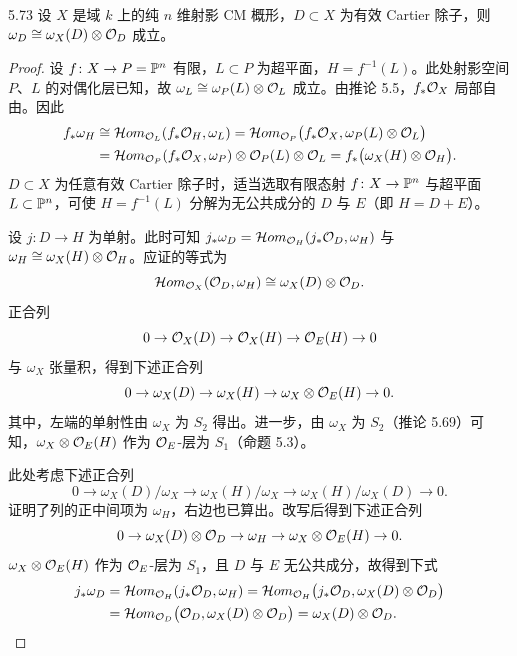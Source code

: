 \begin{propositionp}{5.73}
设 $X$ 是域 $k$ 上的纯 $n$ 维射影 CM 概形，$D\subset X$ 为有效 Cartier 除子，则 $\omega_D\cong\omega_X(D)\otimes\mathcal{O}_D$ 成立。
\end{propositionp}

\begin{proof}
设 $f\colon X\to P=\mathbb{P}^n$ 有限，$L\subset P$ 为超平面，$H=f^{-1}(L)$。此处射影空间 $P$、$L$ 的对偶化层已知，故 $\omega_L\cong\omega_P(L)\otimes\mathcal{O}_L$ 成立。由推论 5.5，$f_*\mathcal{O}_X$ 局部自由。因此
\[
\begin{aligned}
f_*\omega_H&\cong\mathcal{H}om_{\mathcal{O}_L}(f_*\mathcal{O}_H,\omega_L)=\mathcal{H}om_{\mathcal{O}_P}\bigl(f_*\mathcal{O}_X,\omega_P(L)\otimes\mathcal{O}_L\bigr)\\
&=\mathcal{H}om_{\mathcal{O}_P}(f_*\mathcal{O}_X,\omega_P)\otimes\mathcal{O}_P(L)\otimes\mathcal{O}_L=f_*\bigl(\omega_X(H)\otimes\mathcal{O}_H\bigr).
\end{aligned}
\]
$D\subset X$ 为任意有效 Cartier 除子时，适当选取有限态射 $f\colon X\to\mathbb{P}^n$ 与超平面 $L\subset\mathbb{P}^n$，可使 $H=f^{-1}(L)$ 分解为无公共成分的 $D$ 与 $E$（即 $H=D+E$）。

设 $j\colon D\to H$ 为单射。此时可知 $j_*\omega_D=\mathcal{H}om_{\mathcal{O}_H}(j_*\mathcal{O}_D,\omega_H)$ 与 $\omega_H\cong\omega_X(H)\otimes\mathcal{O}_H$。应证的等式为
\[
\mathcal{H}om_{\mathcal{O}_X}(\mathcal{O}_D,\omega_H)\cong\omega_X(D)\otimes\mathcal{O}_D.
\]
正合列
\[
0\to\mathcal{O}_X(D)\to\mathcal{O}_X(H)\to\mathcal{O}_E(H)\to0
\]
与 $\omega_X$ 张量积，得到下述正合列
\[
0\to\omega_X(D)\to\omega_X(H)\to\omega_X\otimes\mathcal{O}_E(H)\to0.
\]
其中，左端的单射性由 $\omega_X$ 为 $S_2$ 得出。进一步，由 $\omega_X$ 为 $S_2$（推论 5.69）可知，$\omega_X\otimes\mathcal{O}_E(H)$ 作为 $\mathcal{O}_E$-层为 $S_1$（命题 5.3）。

此处考虑下述正合列
\[
0\to\omega_X(D)/\omega_X\to\omega_X(H)/\omega_X\to\omega_X(H)/\omega_X(D)\to0.
\]
证明了列的正中间项为 $\omega_H$，右边也已算出。改写后得到下述正合列
\[
0\to\omega_X(D)\otimes\mathcal{O}_D\to\omega_H\to\omega_X\otimes\mathcal{O}_E(H)\to0.
\]
$\omega_X\otimes\mathcal{O}_E(H)$ 作为 $\mathcal{O}_E$-层为 $S_1$，且 $D$ 与 $E$ 无公共成分，故得到下式
\[
\begin{aligned}
j_*\omega_D&=\mathcal{H}om_{\mathcal{O}_H}(j_*\mathcal{O}_D,\omega_H)=\mathcal{H}om_{\mathcal{O}_H}\bigl(j_*\mathcal{O}_D,\omega_X(D)\otimes\mathcal{O}_D\bigr)\\
&=\mathcal{H}om_{\mathcal{O}_D}\bigl(\mathcal{O}_D,\omega_X(D)\otimes\mathcal{O}_D\bigr)=\omega_X(D)\otimes\mathcal{O}_D.
\end{aligned}
\]
\end{proof}


